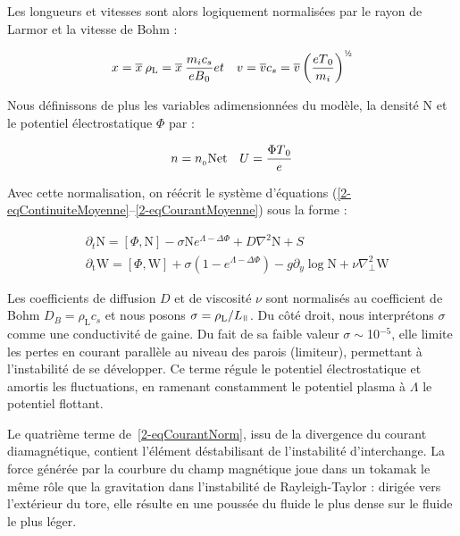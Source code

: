 \begin{refsection}
Les longueurs et vitesses sont alors logiquement normalisées par le rayon de
Larmor et la vitesse de Bohm :

\begin{eqnarray}
x = \overline{x}\:\rho_\text{L} =
\overline{x}\:\frac{m_ic_s}{eB\indice{0}} &
et &
v=\overline{v}c_s=\overline{v}\left(\frac{eT\indice{0}}{m_i}\right)^{\text{\textonehalf}}
\end{eqnarray}

Nous définissons de plus les variables adimensionnées du modèle, la densité
$\text{N}$ et le potentiel électrostatique $\Phi$ par :

\begin{eqnarray}
n = n_{{_{0}}}\text{N} & \text{et} & U=\frac{\Phi T{_{0}}}{e}
\end{eqnarray}

Avec cette normalisation, on
réécrit le système d'équations
(\eqref{2-eqContinuiteMoyenne}--\eqref{2-eqCourantMoyenne}) sous la forme :

\begin{align}
\label{2-eqContinuiteNorm}
&\partial_t \text{N}
= \left[\Phi,\text{N}\right] -\sigma \text{N}e^{\Lambda-\Delta\Phi}
 + D\nabla^2 \text{N} + S
\\
\label{2-eqCourantNorm}
&\partial_\text{t}\text{W} = 
\left[\Phi,\text{W}\right]
+\sigma\left(1-e^{\Lambda-\Delta\Phi}\right) 
-g\partial_y\log\text{N}
+\nu\nabla_\perp^2\text{W}
\end{align}
 
Les coefficients de diffusion $D$ et de viscosité $\nu$ sont normalisés au
coefficient de Bohm $D_B=\rho_\text{L}c_s$ et nous posons
$\sigma=\rho_\text{L}/L_\para$. Du côté droit, nous interprétons $\sigma$
comme une conductivité de gaine. Du fait de sa faible valeur
$\sigma\sim$10$^{-5}$, elle limite les pertes en courant parallèle au niveau des
parois (limiteur), permettant à l'instabilité de se développer. Ce terme régule
le potentiel électrostatique et amortis les fluctuations, en ramenant constamment
le potentiel plasma à $\Lambda$ le potentiel flottant.

Le quatrième terme de~\eqref{2-eqCourantNorm}, issu de la divergence
du courant diamagnétique, contient l'élément déstabilisant de
 l'instabilité d'interchange. La force générée par la courbure du champ
 magnétique joue dans un tokamak le même rôle que la gravitation dans
 l'instabilité de Rayleigh-Taylor : dirigée vers l'extérieur du tore, elle 
 résulte en une poussée du fluide le plus dense sur le fluide le plus léger. 
 

\end{refsection}
